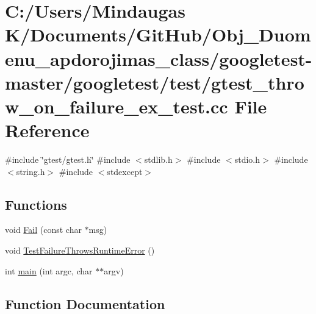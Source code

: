 \hypertarget{googletest-master_2googletest_2test_2gtest__throw__on__failure__ex__test_8cc}{}\section{C\+:/\+Users/\+Mindaugas K/\+Documents/\+Git\+Hub/\+Obj\+\_\+\+Duomenu\+\_\+apdorojimas\+\_\+class/googletest-\/master/googletest/test/gtest\+\_\+throw\+\_\+on\+\_\+failure\+\_\+ex\+\_\+test.cc File Reference}
\label{googletest-master_2googletest_2test_2gtest__throw__on__failure__ex__test_8cc}
{\ttfamily \#include \char`\"{}gtest/gtest.\+h\char`\"{}}\newline
{\ttfamily \#include $<$stdlib.\+h$>$}\newline
{\ttfamily \#include $<$stdio.\+h$>$}\newline
{\ttfamily \#include $<$string.\+h$>$}\newline
{\ttfamily \#include $<$stdexcept$>$}\newline
\subsection*{Functions}
\begin{DoxyCompactItemize}
\item 
void \mbox{\hyperlink{googletest-master_2googletest_2test_2gtest__throw__on__failure__ex__test_8cc_a78ecbe7682643ac0413d57d0b9f27fa6}{Fail}} (const char $\ast$msg)
\item 
void \mbox{\hyperlink{googletest-master_2googletest_2test_2gtest__throw__on__failure__ex__test_8cc_a3ddff869a4b3365dd7a9c3727b996a1d}{Test\+Failure\+Throws\+Runtime\+Error}} ()
\item 
int \mbox{\hyperlink{googletest-master_2googletest_2test_2gtest__throw__on__failure__ex__test_8cc_a3c04138a5bfe5d72780bb7e82a18e627}{main}} (int argc, char $\ast$$\ast$argv)
\end{DoxyCompactItemize}


\subsection{Function Documentation}
\mbox{\label{googletest-master_2googletest_2test_2gtest__throw__on__failure__ex__test_8cc_a78ecbe7682643ac0413d57d0b9f27fa6}} 
